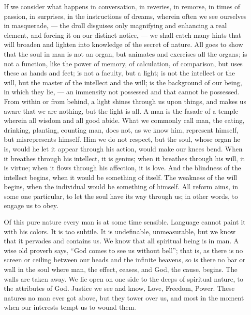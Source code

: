 \documentclass{article}
\begin{document}
If we consider what happens in conversation, in reveries, in remorse, in times of passion, in surprises, in the instructions of dreams, wherein often we see ourselves in masquerade, --- the droll disguises only magnifying and enhancing a real element, and forcing it on our distinct notice, --- we shall catch many hints that will broaden and lighten into knowledge of the secret of nature. All goes to show that the soul in man is not an organ, but animates and exercises all the organs; is not a function, like the power of memory, of calculation, of comparison, but uses these as hands and feet; is not a faculty, but a light; is not the intellect or the will, but the master of the intellect and the will; is the background of our being, in which they lie, --- an immensity not possessed and that cannot be possessed. From within or from behind, a light shines through us upon things, and makes us aware that we are nothing, but the light is all. A man is the fasade of a temple wherein all wisdom and all good abide. What we commonly call man, the eating, drinking, planting, counting man, does not, as we know him, represent himself, but misrepresents himself. Him we do not respect, but the soul, whose organ he is, would he let it appear through his action, would make our knees bend. When it breathes through his intellect, it is genius; when it breathes through his will, it is virtue; when it flows through his affection, it is love. And the blindness of the intellect begins, when it would be something of itself. The weakness of the will begins, when the individual would be something of himself. All reform aims, in some one particular, to let the soul have its way through us; in other words, to engage us to obey.

Of this pure nature every man is at some time sensible. Language cannot paint it with his colors. It is too subtile. It is undefinable, unmeasurable, but we know that it pervades and contains us. We know that all spiritual being is in man. A wise old proverb says, ``God comes to see us without bell''; that is, as there is no screen or ceiling between our heads and the infinite heavens, so is there no bar or wall in the soul where man, the effect, ceases, and God, the cause, begins. The walls are taken away. We lie open on one side to the deeps of spiritual nature, to the attributes of God. Justice we see and know, Love, Freedom, Power. These natures no man ever got above, but they tower over us, and most in the moment when our interests tempt us to wound them.
\end{document}
